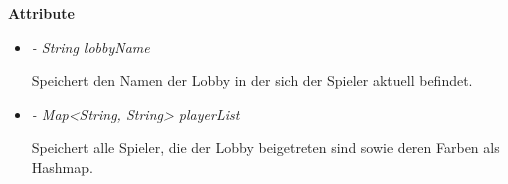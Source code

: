             \textbf{Attribute}
            \begin{itemize}
                \item \textit{- String lobbyName}  
                    \begin{leftbar}[0.9\linewidth]
                        Speichert den Namen der Lobby in der sich der Spieler 
                        aktuell befindet.\\
                    \end{leftbar}
                \item  \textit{- Map<String, String> playerList} 
                    \begin{leftbar}[0.9\linewidth]
                        Speichert alle Spieler, die der Lobby beigetreten sind 
                        sowie deren Farben als Hashmap.
                    \end{leftbar}
            \end{itemize}
               
